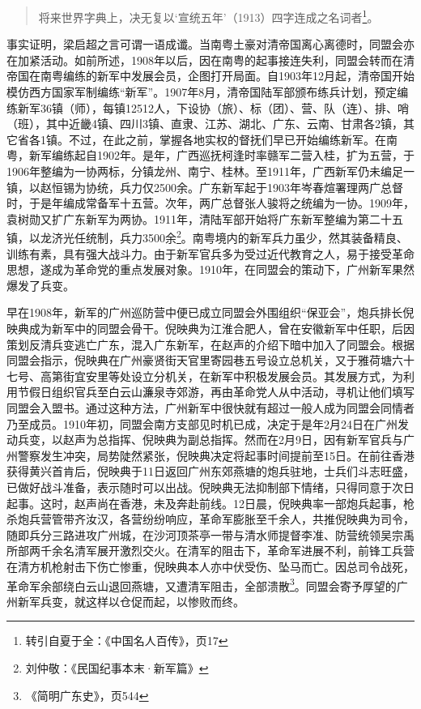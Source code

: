 \begin{quote}

将来世界字典上，决无复以‘宣统五年’（1913）四字连成之名词者\footnote{转引自夏于全：《中国名人百传》，页17}。

\end{quote}

事实证明，梁启超之言可谓一语成谶。当南粤土豪对清帝国离心离德时，同盟会亦在加紧活动。如前所述，1908年以后，因在南粤的起事接连失利，同盟会转而在清帝国在南粤编练的新军中发展会员，企图打开局面。自1903年12月起，清帝国开始模仿西方国家军制编练“新军”。1907年8月，清帝国陆军部颁布练兵计划，预定编练新军36镇（师），每镇12512人，下设协（旅）、标（团）、营、队（连）、排、哨（班），其中近畿4镇、四川3镇、直隶、江苏、湖北、广东、云南、甘肃各2镇，其它省各1镇。不过，在此之前，掌握各地实权的督抚们早已开始编练新军。在南粤，新军编练起自1902年。是年，广西巡抚柯逢时率赣军二营入桂，扩为五营，于1906年整编为一协两标，分镇龙州、南宁、桂林。至1911年，广西新军仍未编足一镇，以赵恒锡为协统，兵力仅2500余。广东新军起于1903年岑春煊署理两广总督时，于是年编成常备军十五营。次年，两广总督张人骏将之统编为一协。1909年，袁树勋又扩广东新军为两协。1911年，清陆军部开始将广东新军整编为第二十五镇，以龙济光任统制，兵力3500余\footnote{刘仲敬：《民国纪事本末·新军篇》}。南粤境内的新军兵力虽少，然其装备精良、训练有素，具有强大战斗力。由于新军官兵多为受过近代教育之人，易于接受革命思想，遂成为革命党的重点发展对象。1910年，在同盟会的策动下，广州新军果然爆发了兵变。

早在1908年，新军的广州巡防营中便已成立同盟会外围组织“保亚会”，炮兵排长倪映典成为新军中的同盟会骨干。倪映典为江淮合肥人，曾在安徽新军中任职，后因策划反清兵变逃亡广东，混入广东新军，在赵声的介绍下暗中加入了同盟会。根据同盟会指示，倪映典在广州豪贤街天官里寄园巷五号设立总机关，又于雅荷塘六十七号、高第街宜安里等处设立分机关，在新军中积极发展会员。其发展方式，为利用节假日组织官兵至白云山濂泉寺郊游，再由革命党人从中活动，寻机让他们填写同盟会入盟书。通过这种方法，广州新军中很快就有超过一般人成为同盟会同情者乃至成员。1910年初，同盟会南方支部见时机已成，决定于是年2月24日在广州发动兵变，以赵声为总指挥、倪映典为副总指挥。然而在2月9日，因有新军官兵与广州警察发生冲突，局势陡然紧张，倪映典决定将起事时间提前至15日。在前往香港获得黄兴首肯后，倪映典于11日返回广州东郊燕塘的炮兵驻地，士兵们斗志旺盛，已做好战斗准备，表示随时可以出战。倪映典无法抑制部下情绪，只得同意于次日起事。这时，赵声尚在香港，未及奔赴前线。12日晨，倪映典率一部炮兵起事，枪杀炮兵营管带齐汝汉，各营纷纷响应，革命军膨胀至千余人，共推倪映典为司令，随即兵分三路进攻广州城，在沙河顶茶亭一带与清水师提督李准、防营统领吴宗禹所部两千余名清军展开激烈交火。在清军的阻击下，革命军进展不利，前锋工兵营在清方机枪射击下伤亡惨重，倪映典本人亦中伏受伤、坠马而亡。因总司令战死，革命军余部绕白云山退回燕塘，又遭清军阻击，全部溃散\footnote{《简明广东史》，页544}。同盟会寄予厚望的广州新军兵变，就这样以仓促而起，以惨败而终。

